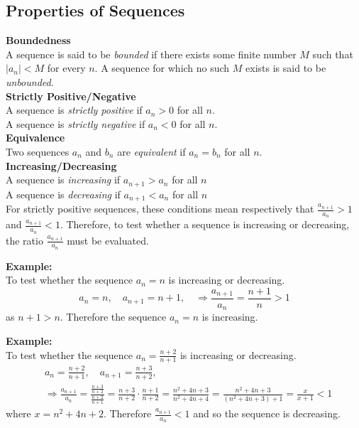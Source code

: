 
\subsection*{Properties of Sequences}

\textbf{Boundedness}\\
A sequence is said to be \emph{bounded} if there exists some finite number $M$ such that $|a_n|<M$ for every $n$. A sequence for which no such $M$ exists is said to be \emph{unbounded}.\\
\textbf{Strictly Positive/Negative}\\
A sequence is \emph{strictly positive} if $a_n > 0$ for all $n$.\\
A sequence is \emph{strictly negative} if $a_n < 0$ for all $n$.\\
\textbf{Equivalence}\\
Two sequences $a_n$ and $b_n$ are \emph{equivalent} if $a_n = b_n$ for all $n$.\\
\textbf{Increasing/Decreasing}\\
A sequence is \emph{increasing} if $a_{n+1} > a_n$ for all $n$\\
A sequence is \emph{decreasing} if $a_{n+1} < a_n$ for all $n$\\

For strictly positive sequences, these conditions mean respectively that $\frac{a_{n+1}}{a_n} > 1$ and $\frac{a_{n+1}}{a_n} < 1$. Therefore, to test whether a sequence is increasing or decreasing, the ratio $\frac{a_{n+1}}{a_n}$ must be evaluated.

\noindent \textbf{ Example:}\\
To test whether the sequence $a_n=n$ is increasing or decreasing.
\begin{equation*}
  a_n=n,\quad a_{n+1}=n+1,\quad \Rightarrow \frac{a_{n+1}}{a_n}=\frac{n+1}{n} > 1 
\end{equation*}
as $n+1 >n$. Therefore the sequence $a_n=n$ is increasing.

\noindent \textbf{ Example:}\\
To test whether the sequence $a_n=\frac{n+2}{n+1}$ is increasing or decreasing.
\begin{align*}
  &a_n=\frac{n+2}{n+1},\quad a_{n+1}=\frac{n+3}{n+2},\\
  &\Rightarrow \frac{a_{n+1}}{a_n}=\frac{\frac{n+3}{n+2}}{\frac{n+2}{n+1}}= \frac{n+3}{n+2}\cdot \frac{n+1}{n+2} = \frac{n^2+4n+3}{n^2+4n+4} = \frac{n^2+4n+3}{\left(n^2+4n+3\right)+1}=\frac{x}{x+1}<1 
\end{align*}
where $x=n^2+4n+2$. Therefore $\frac{a_{n+1}}{a_n}<1$ and so the sequence is decreasing.
\pagebreak
